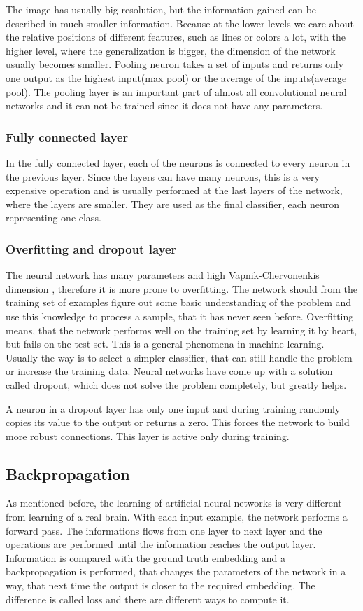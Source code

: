 \documentclass[a4paper,12pt,titlepage, twoside]{article}
\numberwithin{figure}{section}
\begin{document}
The image has usually big resolution, but the information gained can be described in much smaller information. Because at the lower levels we care about the relative positions of different features, such as lines or colors a lot, with the higher level, where the generalization is bigger, the dimension of the network usually becomes smaller. Pooling neuron takes a set of inputs and returns only one output as the highest input(max pool) or the average of the inputs(average pool). The pooling layer\cite{scherer2010evaluation} is an important part of almost all convolutional neural networks and it can not be trained since it does not have any parameters.

\subsubsection{Fully connected layer}
In the fully connected layer, each of the neurons is connected to every neuron in the previous layer. Since the layers can have many neurons, this is a very expensive operation and is usually performed at the last layers of the network, where the layers are smaller. They are used as the final classifier, each neuron representing one class.

\subsubsection{Overfitting and dropout layer}
The neural network has many parameters and high Vapnik-Chervonenkis dimension \cite{blumer1989learnability}, therefore it is more prone to overfitting. The network should from the training set of examples figure out some basic understanding of the problem and use this knowledge to process a sample, that it has never seen before. Overfitting means, that the network performs well on the training set by learning it by heart, but fails on the test set. This is a general phenomena in machine learning. Usually the way is to select a simpler classifier, that can still handle the problem or increase the training data. Neural networks have come up with a solution called dropout, which does not solve the problem completely, but greatly helps. 

A neuron in a dropout layer has only one input and during training randomly copies its value to the output or returns a zero. This forces the network to build more robust connections. This layer is active only during training. 


\subsection{Backpropagation}
\label{sec:back-prop}
As mentioned before, the learning of artificial neural networks is very different from learning of a real brain. With each input example, the network performs a forward pass. The informations flows from one layer to next layer and the operations are performed until the information reaches the output layer. Information is compared with the ground truth embedding and a backpropagation is performed, that changes the parameters of the network in a way, that next time the output is closer to the required embedding. The difference is called loss and there are different ways to compute it.
\end{document}
